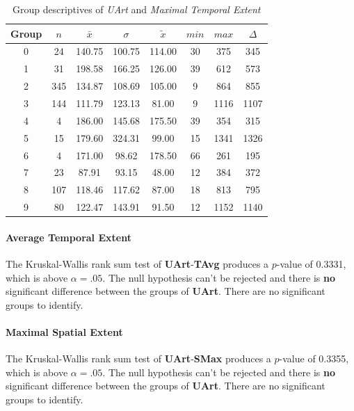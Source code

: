 \begin{table}[ht]
	\small
	\centering
    \begin{tabular}{c|c|c|c|c|c|c|c}
        \toprule
        Group & $n$ & $\bar{x}$ & $\sigma$ & $\tilde{x}$ & $min$ & $max$ & $\Delta$ \\
        \midrule
        0 & 24  & 140.75 & 100.75 & 114.00 & 30 & 375  & 345 \\ 
        1 & 31  & 198.58 & 166.25 & 126.00 & 39 & 612  & 573 \\ 
        2 & 345 & 134.87 & 108.69 & 105.00 & 9  & 864  & 855  \\ 
        3 & 144 & 111.79 & 123.13 & 81.00  & 9  & 1116 & 1107 \\ 
        4 & 4   & 186.00 & 145.68 & 175.50 & 39 & 354  & 315 \\ 
        5 & 15  & 179.60 & 324.31 & 99.00  & 15 & 1341 & 1326 \\ 
        6 & 4   & 171.00 & 98.62  & 178.50 & 66 & 261  & 195 \\ 
        7 & 23  & 87.91  & 93.15  & 48.00  & 12 & 384  & 372 \\ 
        8 & 107 & 118.46 & 117.62 & 87.00  & 18 & 813  & 795 \\ 
        9 & 80  & 122.47 & 143.91 & 91.50  & 12 & 1152 & 1140 \\ 
        \bottomrule
      \end{tabular}
    \caption{Group descriptives of \textit{UArt} and \textit{Maximal Temporal Extent}}
    \label{tbl:descriptives_baysis_initiator_UArt_TMax}
\end{table}

\paragraph{Average Temporal Extent}
The Kruskal-Wallis rank sum test of \textbf{UArt}-\textbf{TAvg} produces a $p$-value of 0.3331, which is above $\alpha=.05$. The null hypothesis can't be rejected and there is \textbf{no} significant difference between the groups of \textbf{UArt}. There are no significant groups to identify.

\paragraph{Maximal Spatial Extent}
The Kruskal-Wallis rank sum test of \textbf{UArt}-\textbf{SMax} produces a $p$-value of 0.3355, which is above $\alpha=.05$. The null hypothesis can't be rejected and there is \textbf{no} significant difference between the groups of \textbf{UArt}. There are no significant groups to identify.

